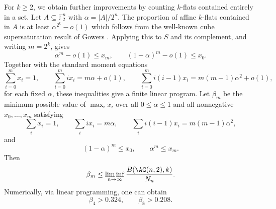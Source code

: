 \documentclass[10pt]{article}
\theoremstyle{definition}
\newcommand{\zs}[1]{\textcolor{magenta}{\textbf{#1}}}
\begin{document}
	{For \( k\ge 2\), we obtain further improvements by counting
		\(k\)-flats contained entirely in a set. Let
		\(A\subseteq\mathbb F_2^n\) with \(\alpha=|A|/2^n\).
		The
		proportion of affine \(k\)-flats contained in \(A\) is at least
		\(\alpha^{2^k}-o(1)\) which follows from the well-known cube supersaturation result of Gowers \cite[Lemma 3.7]{Gowers01}.} Applying this to \(S\) and its complement, and
	writing \(m=2^k\), gives
	\[
	\ensuremath{\alpha^m-o(1)\leq x_m,\qquad
		(1-\alpha)^m-o(1)\leq x_0}.
	\]
	Together with the standard moment equations
	\[
	\sum_{i=0}^m x_i=1,\qquad
	\sum_{i=0}^m i x_i=m\alpha+o(1),\qquad
	\sum_{i=0}^m i(i-1)x_i=m(m-1)\alpha^2+o(1),
	\]
	{for each fixed \(\alpha\),}
	these inequalities give a finite linear program. Let \(\beta_m\) be the
	minimum possible value of \(\max_i x_i\) over all
	\(0\leq\alpha\leq1\) and all nonnegative \(x_0,\ldots,x_m\) satisfying
	\[
	\sum_i x_i=1,\qquad
	\sum_i i x_i=m\alpha,\qquad
	\sum_i i(i-1)x_i=m(m-1)\alpha^2,
	\]
	and
	\[
	\ensuremath{(1-\alpha)^m\leq x_0,\qquad \alpha^m\leq x_m}.
	\]
	Then
	\[
	\ensuremath{\beta_m\leq\liminf_{n\to\infty}\frac{B(\AG(n,2),k)}{N_n}}.
	\]
	Numerically, via linear programming, one can obtain  %
	\[
	\beta_4>0.324,\qquad \beta_8>0.208.
	\]
	

	
\end{document}
